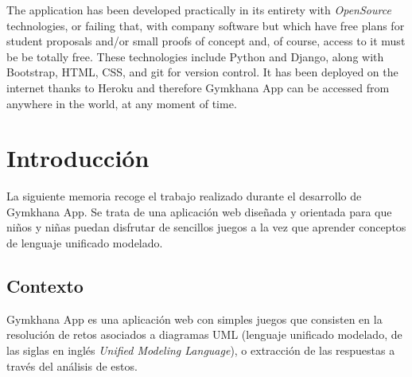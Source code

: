 \documentclass[a4paper, 12pt]{book}
\begin{document}
The application has been developed practically in its entirety with \emph{OpenSource} technologies, or failing that, with company software but which have free plans for student proposals and/or small proofs of concept and, of course, access to it must be be totally free. These technologies include Python and Django, along with Bootstrap, HTML, CSS, and git for version control. It has been deployed on the internet thanks to Heroku and therefore Gymkhana App can be accessed from anywhere in the world, at any moment of time.




\tableofcontents 
\cleardoublepage
\listoffigures %



\cleardoublepage
\chapter{Introducción}
\label{sec:intro} %

La siguiente memoria recoge el trabajo realizado durante el desarrollo de Gymkhana App. Se trata de una aplicación web diseñada y orientada para que niños y niñas puedan disfrutar de sencillos juegos a la vez que aprender conceptos de lenguaje unificado modelado.

\section{Contexto}
\label{sec:seccion}
Gymkhana App es una aplicación web con simples juegos que consisten en la resolución de retos asociados a diagramas UML (lenguaje unificado modelado, de las siglas en inglés \emph{Unified Modeling Language}), o extracción de las respuestas a través del análisis de estos. 
\end{document}
